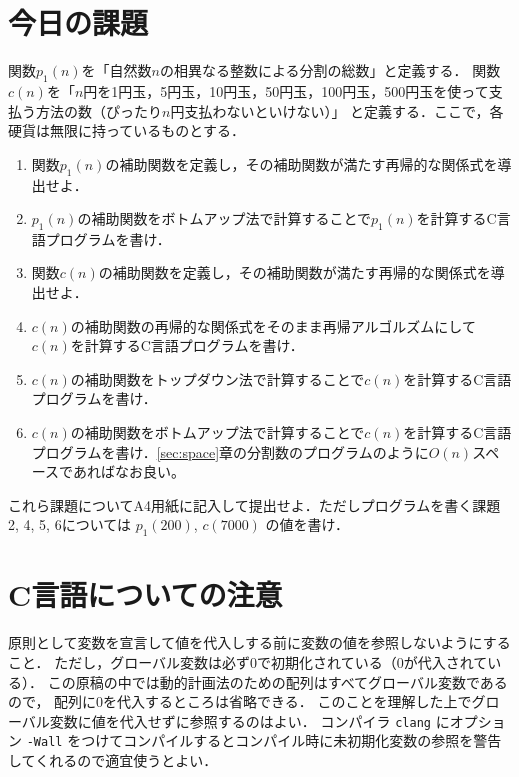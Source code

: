 \documentclass[a4paper,twoside,onecolumn,openany,article]{memoir}
\theoremstyle{remark}
\begin{document}
\section{今日の課題}\label{sec:assignment}
関数$p_1(n)$を「自然数$n$の相異なる整数による分割の総数」と定義する．
関数$c(n)$を「$n$円を1円玉，5円玉，10円玉，50円玉，100円玉，500円玉を使って支払う方法の数（ぴったり$n$円支払わないといけない）」
と定義する．ここで，各硬貨は無限に持っているものとする．
\begin{enumerate}
\item 関数$p_1(n)$の補助関数を定義し，その補助関数が満たす再帰的な関係式を導出せよ．
\item $p_1(n)$の補助関数をボトムアップ法で計算することで$p_1(n)$を計算するC言語プログラムを書け．
\item 関数$c(n)$の補助関数を定義し，その補助関数が満たす再帰的な関係式を導出せよ．
\item $c(n)$の補助関数の再帰的な関係式をそのまま再帰アルゴルズムにして$c(n)$を計算するC言語プログラムを書け．
\item $c(n)$の補助関数をトップダウン法で計算することで$c(n)$を計算するC言語プログラムを書け．
\item $c(n)$の補助関数をボトムアップ法で計算することで$c(n)$を計算するC言語プログラムを書け．\ref{sec:space}章の分割数のプログラムのように$O(n)$スペースであればなお良い。
\end{enumerate}
これら課題についてA4用紙に記入して提出せよ．ただしプログラムを書く課題 2, 4, 5, 6については $p_1(200)$, $c(7000)$ の値を書け．

\section*{C言語についての注意}
原則として変数を宣言して値を代入しする前に変数の値を参照しないようにすること．
ただし，グローバル変数は必ず0で初期化されている（0が代入されている）．
この原稿の中では動的計画法のための配列はすべてグローバル変数であるので，
配列に0を代入するところは省略できる．
このことを理解した上でグローバル変数に値を代入せずに参照するのはよい．
コンパイラ \texttt{clang} にオプション \texttt{-Wall} をつけてコンパイルするとコンパイル時に未初期化変数の参照を警告してくれるので適宜使うとよい．
\end{document}
